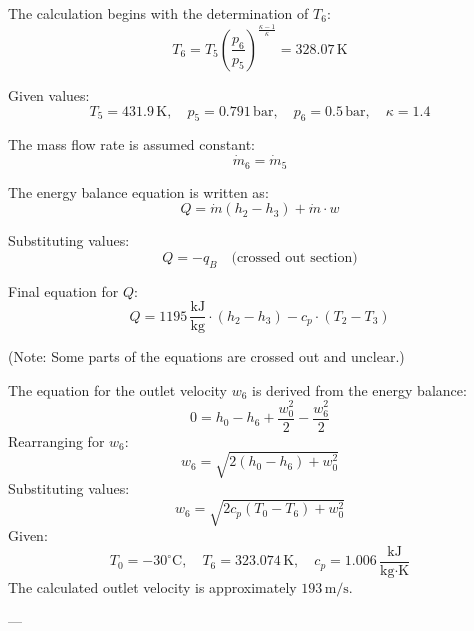 The calculation begins with the determination of \( T_6 \):  
\[
T_6 = T_5 \left( \frac{p_6}{p_5} \right)^{\frac{\kappa - 1}{\kappa}} = 328.07 \, \text{K}
\]  

Given values:  
\[
T_5 = 431.9 \, \text{K}, \quad p_5 = 0.791 \, \text{bar}, \quad p_6 = 0.5 \, \text{bar}, \quad \kappa = 1.4
\]  

The mass flow rate is assumed constant:  
\[
\dot{m}_6 = \dot{m}_5
\]  

The energy balance equation is written as:  
\[
Q = \dot{m} \left( h_2 - h_3 \right) + \dot{m} \cdot w
\]  

Substituting values:  
\[
Q = -q_B \quad \text{(crossed out section)}  
\]  

Final equation for \( Q \):  
\[
Q = 1195 \, \frac{\text{kJ}}{\text{kg}} \cdot \left( h_2 - h_3 \right) - c_p \cdot (T_2 - T_3)
\]  

(Note: Some parts of the equations are crossed out and unclear.)

The equation for the outlet velocity \( w_6 \) is derived from the energy balance:  
\[
0 = h_0 - h_6 + \frac{w_0^2}{2} - \frac{w_6^2}{2}
\]  
Rearranging for \( w_6 \):  
\[
w_6 = \sqrt{2(h_0 - h_6) + w_0^2}
\]  
Substituting values:  
\[
w_6 = \sqrt{2 c_p (T_0 - T_6) + w_0^2}
\]  
Given:  
\[
T_0 = -30^\circ\text{C}, \quad T_6 = 323.074 \, \text{K}, \quad c_p = 1.006 \, \frac{\text{kJ}}{\text{kg·K}}
\]  
The calculated outlet velocity is approximately \( 193 \, \text{m/s} \).

---